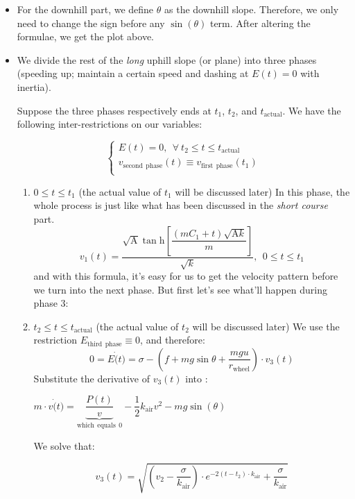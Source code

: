 \documentclass[14pt]{article}
\theoremstyle{definition}
\theoremstyle{remark}
\numberwithin{equation}{section}
\begin{document}
	\begin{itemize}
		\item For the downhill part, we define \(\theta\) as the downhill slope. Therefore, we only need to change the sign before any \(\sin\left(\theta\right)\) term. After altering the formulae, we get the plot above.
		\item We divide the rest of the \textit{long} uphill slope (or plane) into three phases (speeding up; maintain a certain speed and dashing at \(E(t)=0\) with inertia).

			Suppose the three phases respectively ends at \(t_1\), \(t_2\), and \(t_{\mathrm{actual}}\). We have the following inter-restrictions on our variables:

			$$
			\begin{cases}
				E \left( t \right) =0,\:\:\forall \:t_2\le t\le t_{\mathrm{actual}}\\
				v_{\mathrm{second}\:\:\mathrm{phase}}\left( t \right) \equiv v_{\mathrm{first}\:\:\mathrm{phase}}\left( t_1 \right)\\
			\end{cases}
			$$
			\begin{enumerate}
				\item \(0\leq t\leq t_1\) (the actual value of \(t_1\) will be discussed later)
					In this phase, the whole process is just like what has been discussed in the \textit{short course} part.
					\[v_1(t)=\dfrac{\sqrt{\mathrm{A}} \tan \mathrm{h}\left[\dfrac{\left(m C _1+t\right)\sqrt{\mathrm{A}k}}{m}\right]}{\sqrt{ k }},\:\:0\leq t\leq t_1\]
					and with this formula, it's easy for us to get the velocity pattern before we turn into the next phase. But first let's see what'll happen during phase 3:
				\item \(t_2\leq t\leq t_{\mathrm{actual}}\) (the actual value of \(t_2\) will be discussed later)
					We use the restriction \(E_{\mathrm{third\:\:phase}}\equiv 0\), and therefore:
					\[0=E \dot(t)=\sigma-\left(f+mg\sin\theta+\dfrac{mgu}{r_{\mathrm{wheel}}}\right)\cdot v_3(t)\]
					Substitute the derivative of \(v_3(t)\) into :

					\(m \cdot v\dot(t)=\underset{\mathrm{which\:\:equals\:\:}0}{\underbrace{\dfrac{P (t)}{v}}}-\dfrac{1}{2} k_{\mathrm{air}} v^2-mg\sin\left(\theta\right)\) 

					We solve that:

					\[v_3\left( t \right) =\sqrt{\left( v_2-\frac{\sigma}{k_{\mathrm{air}}} \right) \cdot e^{-2\left( t-t_2 \right) \cdot k_{\mathrm{air}}}+\frac{\sigma}{k_{\mathrm{air}}}}\]



\end{enumerate}
\end{itemize}
\end{document}
